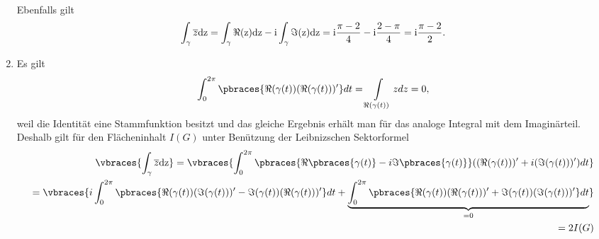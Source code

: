 \begin{solution}
\begin{enumerate}[label = \alph*)]
\begin{align*}
        \end{align*}
        Ebenfalls gilt 
        \begin{align*}
            \int_{\gamma} \overline{z} \rm{d}z = \int_\gamma \Re(z) \rm{d}z - \rm{i} \int_\gamma \Im(z) \rm{d}z = \rm{i} \frac{\pi - 2}{4} - \rm{i} \frac{2 - \pi}{4} = \rm{i} \frac{\pi - 2}{2}.
        \end{align*}
        \item Es gilt 
        \begin{align*}
            \int_0^{2\pi} \pbraces{\Re(\gamma(t))(\Re(\gamma(t)))^\prime} dt = \int\limits_{\Re(\gamma(t))} z dz = 0,
        \end{align*}
        weil die Identität eine Stammfunktion besitzt und das gleiche Ergebnis erhält man für das analoge Integral mit dem Imaginärteil. Deshalb gilt für den Flächeninhalt $I(G)$ unter Benützung der Leibnizschen Sektorformel
        \begin{align*}
          \vbraces{\int_\gamma \overline{z} \rm{d}z} = \vbraces{\int_0^{2\pi} \pbraces{\Re\pbraces{\gamma(t)} - i \Im\pbraces{\gamma(t)}} ((\Re(\gamma(t)))^\prime + i(\Im(\gamma(t)))^\prime) dt} \\ 
          = \vbraces{i\int_0^{2\pi} \pbraces{\Re(\gamma(t))(\Im(\gamma(t)))^\prime - \Im(\gamma(t))(\Re(\gamma(t)))^\prime} dt  + \underbrace{\int_0^{2\pi} \pbraces{\Re(\gamma(t))(\Re(\gamma(t)))^\prime + \Im(\gamma(t))(\Im(\gamma(t)))^\prime} dt}_{= 0}} \\
          = 2 I(G) 
        \end{align*}
    \end{enumerate}

\end{solution}